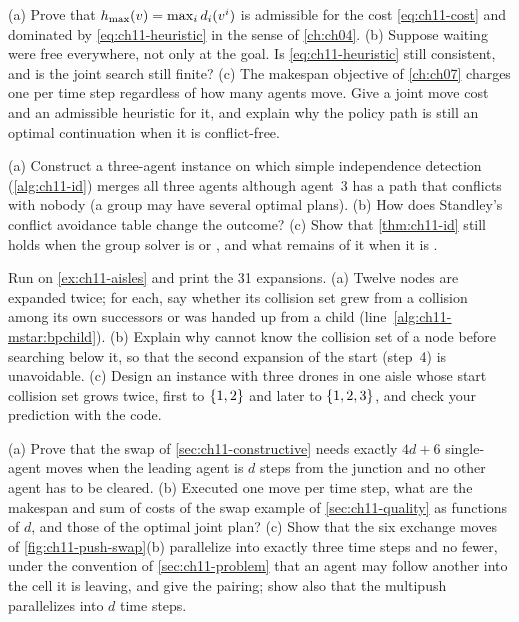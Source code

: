 \begin{exercise}[\difficulty{2}]
\label{exr:ch11-heuristic}
(a) Prove that $h_{\max}(v) = \max_i d_i(v^i)$ is admissible for the
cost \cref{eq:ch11-cost} and dominated by \cref{eq:ch11-heuristic} in the
sense of \cref{ch:ch04}. (b) Suppose waiting were free everywhere, not only
at the goal. Is \cref{eq:ch11-heuristic} still consistent, and is the joint
search still finite? (c) The makespan objective of \cref{ch:ch07} charges
one per time step regardless of how many agents move. Give a joint move
cost and an admissible heuristic for it, and explain why the policy path is
still an optimal continuation when it is conflict-free.
\end{exercise}

\begin{exercise}[\difficulty{2}]
\label{exr:ch11-id-groups}
(a) Construct a three-agent instance on which simple independence detection
(\cref{alg:ch11-id}) merges all three agents although agent~3 has a path that conflicts with nobody (a group may have several optimal
plans). (b) How does Standley's conflict avoidance table change the outcome? (c) Show that \cref{thm:ch11-id} still holds when the
group solver is \mstar or \cbs, and what remains of it when it is \ecbs.
\end{exercise}

\begin{exercise}[\difficulty{2}]
\label{exr:ch11-reexpansion}
Run  on \cref{ex:ch11-aisles} and print the
31 expansions. (a) Twelve nodes are expanded twice; for each, say whether
its collision set grew from a collision among its own successors or was
handed up from a child (line~\ref{alg:ch11-mstar:bpchild}). (b) Explain why
\mstar cannot know the collision set of a node before searching below it,
so that the second expansion of the start (step~4) is unavoidable.
(c) Design an instance with three drones in one aisle whose start collision
set grows twice, first to $\left\{ 1,2 \right\}$ and later to $\left\{ 1,2,3 \right\}$, and check
your prediction with the code.
\end{exercise}

\begin{exercise}[\difficulty{2}]
\label{exr:ch11-swap-count}
(a) Prove that the swap of \cref{sec:ch11-constructive} needs exactly
$4d + 6$ single-agent moves when the leading agent is $d$ steps from the
junction and no other agent has to be cleared. (b) Executed one move per
time step, what are the makespan and sum of costs of the swap example of
\cref{sec:ch11-quality} as functions of $d$, and those of the optimal joint
plan? (c) Show that the six exchange moves of \cref{fig:ch11-push-swap}(b)
parallelize into exactly three time steps and no fewer, under the
convention of \cref{sec:ch11-problem} that an agent may follow another into
the cell it is leaving, and give the pairing; show also that the multipush
parallelizes into $d$ time steps.
\end{exercise}

